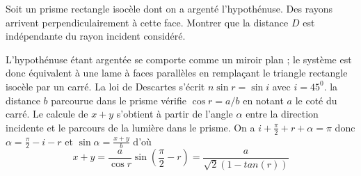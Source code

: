 \begin{Exercise}[title=Prisme]
Soit un prisme rectangle isocèle dont on a argenté l’hypothénuse. Des rayons
arrivent perpendiculairement à cette face.
Montrer que la distance $D$ est indépendante du rayon incident considéré.
	\begin{center}
		
	\end{center}

\end{Exercise}
\begin{Answer}
L’hypothénuse étant argentée se comporte comme un miroir plan ; le système est
donc équivalent à une lame à faces parallèles en remplaçant le triangle
rectangle isocèle par un carré. La loi de Descartes s'écrit $n\sin r =\sin i$
avec $i = 45^0$. la distance $b$ parcourue dans le prisme vérifie $\cos r= a/b$
en notant $a$ le coté du carré. Le calcule de $x+y$ s'obtient à partir de
l'angle $\alpha$ entre la direction incidente et le parcours de la lumière dans le
prisme. On a $i+\frac{\pi}{2}+r+\alpha=\pi$ donc $\alpha=\frac{\pi}{2}-i-r$ et
$\sin\alpha = \frac{x+y}{b}$ d'où
\[x+y= \frac{a}{\cos r}\sin(\frac{\pi}{2}-r)=\frac{a}{\sqrt{2}(1-tan(r))}\]
\end{Answer}

